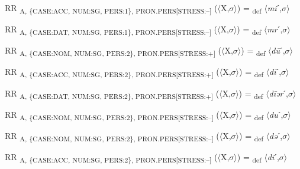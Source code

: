 {\begin{exe}
 RR \textsubscript{A, \{CASE:ACC, NUM:SG, PERS:1\}, PRON.PERS[STRESS:–]} ($\langle$X,$\sigma $$\rangle$) = \textsubscript{def} $\langle$\textit{mi}ˊ,$\sigma $$\rangle$
\end{exe}

\begin{exe}
 RR \textsubscript{A, \{CASE:DAT, NUM:SG, PERS:1\}, PRON.PERS[STRESS:–]} ($\langle$X,$\sigma $$\rangle$) = \textsubscript{def} $\langle$\textit{mr}ˊ,$\sigma $$\rangle$
\end{exe}

\begin{exe}
 RR \textsubscript{A, \{CASE:NOM, NUM:SG, PERS:2\}, PRON.PERS[STRESS:+]} ($\langle$X,$\sigma $$\rangle$) = \textsubscript{def} $\langle$\textit{d\=u}ˊ,$\sigma $$\rangle$
\end{exe}

\begin{exe}
 RR \textsubscript{A, \{CASE:ACC, NUM:SG, PERS:2\}, PRON.PERS[STRESS:+]} ($\langle$X,$\sigma $$\rangle$) = \textsubscript{def} $\langle$\textit{d\=i}ˊ,$\sigma $$\rangle$
\end{exe}

\begin{exe}
 RR \textsubscript{A, \{CASE:DAT, NUM:SG, PERS:2\}, PRON.PERS[STRESS:+]} ($\langle$X,$\sigma $$\rangle$) = \textsubscript{def} $\langle$\textit{d\=iər}ˊ,$\sigma $$\rangle$
\end{exe}

\begin{exe}
 RR \textsubscript{A, \{CASE:NOM, NUM:SG, PERS:2\}, PRON.PERS[STRESS:–]} ($\langle$X,$\sigma $$\rangle$) = \textsubscript{def} $\langle$\textit{du}ˊ,$\sigma $$\rangle$
\end{exe}

\begin{exe}
 RR \textsubscript{A, \{CASE:NOM, NUM:SG, PERS:2\}, PRON.PERS[STRESS:–]} ($\langle$X,$\sigma $$\rangle$) = \textsubscript{def} $\langle$\textit{də}ˊ,$\sigma $$\rangle$
\end{exe}

\begin{exe}
 RR \textsubscript{A, \{CASE:ACC, NUM:SG, PERS:2\}, PRON.PERS[STRESS:–]} ($\langle$X,$\sigma $$\rangle$) = \textsubscript{def} $\langle$\textit{di}ˊ,$\sigma $$\rangle$
\end{exe}

}
